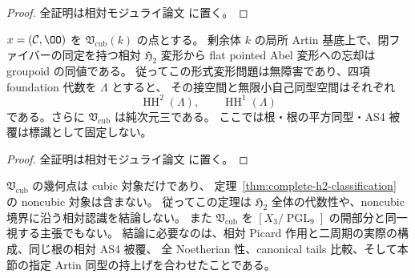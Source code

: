 \begin{proof}
全証明は相対モジュライ論文 \cite[\texttt{cubic_smooth_atlas}]{QuadricModuli2026} に置く。
\end{proof}

\begin{corollary}
\label{cor:cubic-formal-h2-abelian}
$x=(\mathcal C,\OO)$ を $\mathfrak V_{\mathrm{cub}}(k)$ の点とする。
剰余体 $k$ の局所 Artin 基底上で、閉ファイバーの同定を持つ相対 $\mathfrak H_2$ 変形から
flat pointed Abel 変形への忘却は groupoid の同値である。
従ってこの形式変形問題は無障害であり、四項 foundation 代数を $\Lambda$ とすると、
その接空間と無限小自己同型空間はそれぞれ
\[
 \operatorname{HH}^2(\Lambda),\qquad\operatorname{HH}^1(\Lambda)
\]
である。さらに $\mathfrak V_{\mathrm{cub}}$ は純次元三である。
ここでは根・根の平方同型・AS4 被覆は標識として固定しない。
\end{corollary}

\begin{proof}
全証明は相対モジュライ論文 \cite[\texttt{cubic_smooth_atlas}]{QuadricModuli2026} に置く。
\end{proof}

\begin{remark}
$\mathfrak V_{\mathrm{cub}}$ の幾何点は cubic 対象だけであり、
定理~\ref{thm:complete-h2-classification} の noncubic 対象は含まない。
従ってこの定理は $\mathfrak H_2$ 全体の代数性や、noncubic 境界に沿う相対認識を結論しない。
また $\mathfrak V_{\mathrm{cub}}$ を $[X_3/\operatorname{PGL}_9]$ の開部分と同一視する主張でもない。
結論に必要なのは、相対 Picard 作用と二周期の実際の構成、同じ根の相対 AS4 被覆、
全 Noetherian 性、canonical tails 比較、そして本節の指定 Artin 同型の持上げを合わせたことである。
\end{remark}
